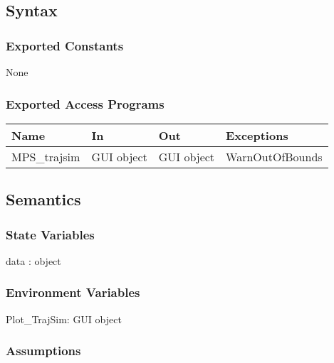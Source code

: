 \documentclass[12pt, titlepage]{article}
\begin{document}
\subsection{Syntax}

\subsubsection{Exported Constants}

None

\subsubsection{Exported Access Programs}

\begin{center}
\begin{tabular}{p{2cm} p{4cm} p{4cm} p{2cm}}
\hline
\textbf{Name} & \textbf{In} & \textbf{Out} & \textbf{Exceptions} \\
\hline
MPS\_trajsim & GUI object & GUI object & WarnOutOfBounds \\
\hline
\end{tabular}
\end{center}

\subsection{Semantics}

\subsubsection{State Variables}

data : object

\subsubsection{Environment Variables}

\noindent Plot{\_}TrajSim: GUI object\\


\subsubsection{Assumptions}
\end{document}
